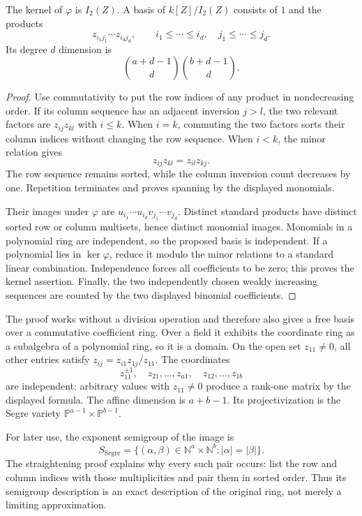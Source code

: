 \begin{theorem}
The kernel of \(\varphi\) is \(I_2(Z)\).  A basis of
\(k[Z]/I_2(Z)\) consists of \(1\) and the products
\[
 z_{i_1j_1}\cdots z_{i_dj_d},
 \qquad i_1\le\cdots\le i_d,\quad j_1\le\cdots\le j_d.
\]
Its degree \(d\) dimension is
\[
 \binom{a+d-1}{d}\binom{b+d-1}{d}.
\]
\end{theorem}
\begin{proof}
Use commutativity to put the row indices of any product in
nondecreasing order.  If its column sequence has an adjacent
inversion \(j>l\), the two relevant factors are
\(z_{ij}z_{kl}\) with \(i\le k\).  When \(i=k\), commuting
the two factors sorts their column indices without changing
the row sequence.  When \(i<k\), the minor relation gives
\[
 z_{ij}z_{kl}=z_{il}z_{kj}.
\]
The row sequence remains sorted, while the column inversion
count decreases by one.  Repetition terminates and proves
spanning by the displayed monomials.

Their images under \(\varphi\) are
\(u_{i_1}\cdots u_{i_d}v_{j_1}\cdots v_{j_d}\).
Distinct standard products have distinct sorted row or column
multisets, hence distinct monomial images.  Monomials in a
polynomial ring are independent, so the proposed basis is
independent.  If a polynomial lies in \(\ker\varphi\), reduce
it modulo the minor relations to a standard linear combination.
Independence forces all coefficients to be zero; this proves
the kernel assertion.  Finally, the two independently chosen
weakly increasing sequences are counted by the two displayed
binomial coefficients.
\end{proof}

The proof works without a division operation and therefore
also gives a free basis over a commutative coefficient ring.
Over a field it exhibits the coordinate ring as a subalgebra
of a polynomial ring, so it is a domain.  On the open set
\(z_{11}\ne0\), all other entries satisfy
\(z_{ij}=z_{i1}z_{1j}/z_{11}\).  The coordinates
\[
 z_{11}^{\pm1},\quad z_{21},\ldots,z_{a1},
       \quad z_{12},\ldots,z_{1b}
\]
are independent: arbitrary values with \(z_{11}\ne0\)
produce a rank-one matrix by the displayed formula.
The affine dimension is \(a+b-1\).  Its projectivization
is the Segre variety
\(\mathbb P^{a-1}\times\mathbb P^{b-1}\).

For later use, the exponent semigroup of the image is
\[
 S_{\mathrm{Segre}}
  =\{(\alpha,\beta)\in\mathbb N^a\times\mathbb N^b:
                      |\alpha|=|\beta|\}.
\]
The straightening proof explains why every such pair occurs:
list the row and column indices with those multiplicities
and pair them in sorted order.  Thus its semigroup
description is an exact description of the original ring,
not merely a limiting approximation.

